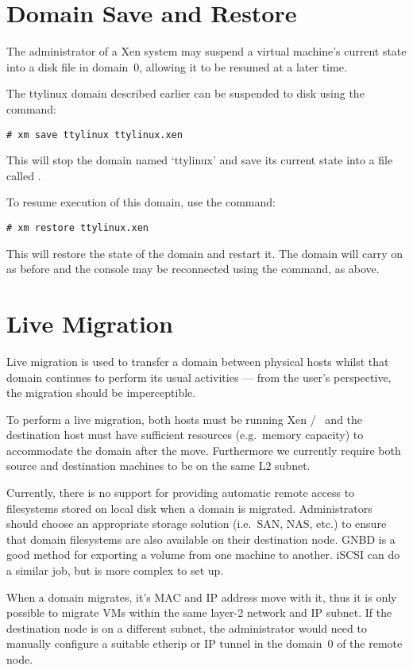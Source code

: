 \section{Domain Save and Restore}

The administrator of a Xen system may suspend a virtual machine's
current state into a disk file in domain~0, allowing it to be resumed
at a later time.

The ttylinux domain described earlier can be suspended to disk using
the command:
\begin{verbatim}
# xm save ttylinux ttylinux.xen
\end{verbatim}

This will stop the domain named `ttylinux' and save its current state
into a file called .

To resume execution of this domain, use the  command:
\begin{verbatim}
# xm restore ttylinux.xen
\end{verbatim}

This will restore the state of the domain and restart it.  The domain
will carry on as before and the console may be reconnected using the
 command, as above.

\section{Live Migration}

Live migration is used to transfer a domain between physical hosts
whilst that domain continues to perform its usual activities --- from
the user's perspective, the migration should be imperceptible.

To perform a live migration, both hosts must be running Xen / \xend\
and the destination host must have sufficient resources (e.g.\ memory
capacity) to accommodate the domain after the move. Furthermore we
currently require both source and destination machines to be on the
same L2 subnet.

Currently, there is no support for providing automatic remote access
to filesystems stored on local disk when a domain is migrated.
Administrators should choose an appropriate storage solution (i.e.\
SAN, NAS, etc.) to ensure that domain filesystems are also available
on their destination node. GNBD is a good method for exporting a
volume from one machine to another. iSCSI can do a similar job, but is
more complex to set up.

When a domain migrates, it's MAC and IP address move with it, thus it
is only possible to migrate VMs within the same layer-2 network and IP
subnet. If the destination node is on a different subnet, the
administrator would need to manually configure a suitable etherip or
IP tunnel in the domain~0 of the remote node.

